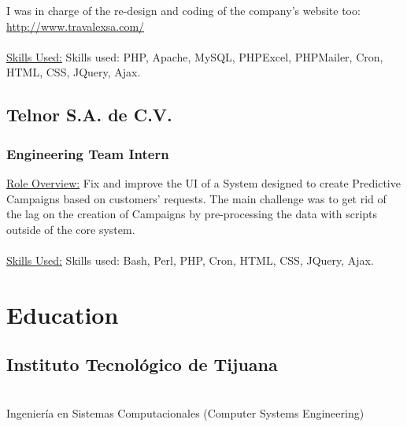 \documentclass[letterpaper, 11pt]{article}
\begin{document}
I was in charge of the re-design and coding of the company’s website too:\\ 
\href{http://www.travalexsa.com/}{http://www.travalexsa.com/}\\\\
	\underline{Skills Used:}
	Skills used: PHP, Apache, MySQL, PHPExcel, PHPMailer, Cron, HTML, CSS, JQuery, Ajax.
	\subsection*{\LARGE{\textbf{Telnor S.A. de C.V.}}}
	\subsubsection*{Engineering Team Intern}
	\underline{Role Overview:} 
	Fix and improve the UI of a System designed to create Predictive Campaigns based on customers’ requests. The main challenge was to get rid of the lag on the creation of Campaigns by pre-processing the data with scripts outside of the core system.\\\\
	\underline{Skills Used:}
	Skills used: Bash, Perl, PHP, Cron, HTML, CSS, JQuery, Ajax.
	\section*{\huge{Education}}
	\noindent\makebox[\linewidth]{\rule{\textwidth}{0.5pt}} 
	\subsection*{\LARGE{\textbf{Instituto Tecnológico de Tijuana}}}
	\\
	Ingeniería en Sistemas Computacionales (Computer Systems Engineering)\\
\end{document}
